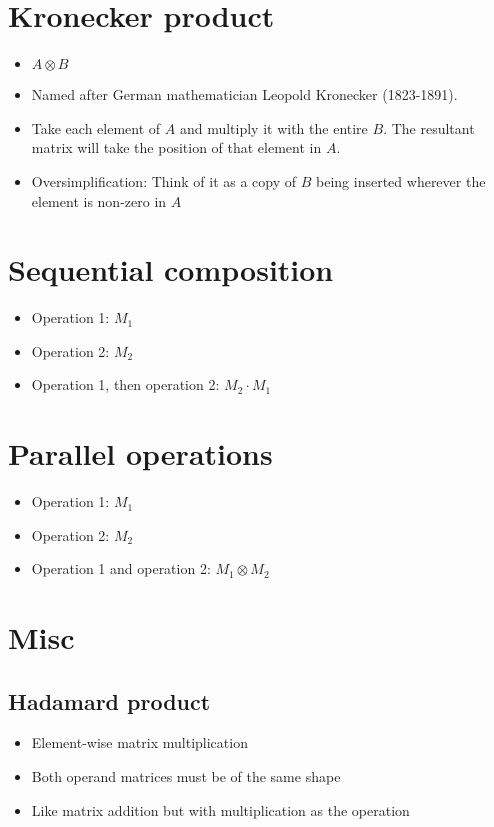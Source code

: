 \documentclass[12pt]{article}
\begin{document}
\section{Kronecker product}
\begin{itemize}
\item
  $A \otimes B$
\item
  Named after German mathematician Leopold Kronecker (1823-1891).
\item 
  Take each element of $A$ and multiply it with the entire $B$. The
  resultant matrix will take the position of that element in $A$.
\item
  Oversimplification:
  Think of it as a copy of $B$ being inserted wherever the element
  is non-zero in $A$
\end{itemize}

\section{Sequential composition}
\begin{itemize}
\item Operation 1: $M_1$
\item Operation 2: $M_2$
\item Operation 1, then operation 2: $M_2 \cdot M_1$
\end{itemize}

\section{Parallel operations}
\begin{itemize}
\item Operation 1: $M_1$
\item Operation 2: $M_2$
\item Operation 1 and operation 2: $M_1 \otimes M_2$
\end{itemize}

\section{Misc}
\subsection{Hadamard product}
\begin{itemize}
\item Element-wise matrix multiplication
\item Both operand matrices must be of the same shape
\item Like matrix addition but with multiplication as the operation
\end{itemize} 
\end{document}
